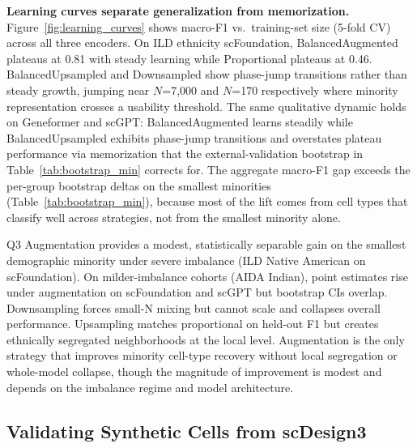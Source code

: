 \documentclass[sigconf]{acmart}
\begin{document}
\textbf{Learning curves separate generalization from memorization.} Figure~\ref{fig:learning_curves} shows macro-F1 vs.\ training-set size (5-fold CV) across all three encoders. On ILD ethnicity scFoundation, BalancedAugmented plateaus at 0.81 with steady learning while Proportional plateaus at 0.46. BalancedUpsampled and Downsampled show phase-jump transitions rather than steady growth, jumping near $N$=7{,}000 and $N$=170 respectively where minority representation crosses a usability threshold. The same qualitative dynamic holds on Geneformer and scGPT: BalancedAugmented learns steadily while BalancedUpsampled exhibits phase-jump transitions and overstates plateau performance via memorization that the external-validation bootstrap in Table~\ref{tab:bootstrap_min} corrects for. The aggregate macro-F1 gap exceeds the per-group bootstrap deltas on the smallest minorities (Table~\ref{tab:bootstrap_min}), because most of the lift comes from cell types that classify well across strategies, not from the smallest minority alone.

\begin{answerbox}{Q3}
Augmentation provides a modest, statistically separable gain on the smallest demographic minority under severe imbalance (ILD Native American on scFoundation). On milder-imbalance cohorts (AIDA Indian), point estimates rise under augmentation on scFoundation and scGPT but bootstrap CIs overlap. Downsampling forces small-N mixing but cannot scale and collapses overall performance. Upsampling matches proportional on held-out F1 but creates ethnically segregated neighborhoods at the local level. Augmentation is the only strategy that improves minority cell-type recovery without local segregation or whole-model collapse, though the magnitude of improvement is modest and depends on the imbalance regime and model architecture.
\end{answerbox}

\subsection{Validating Synthetic Cells from scDesign3}
\label{sec:scdesign3_results}
\end{document}
